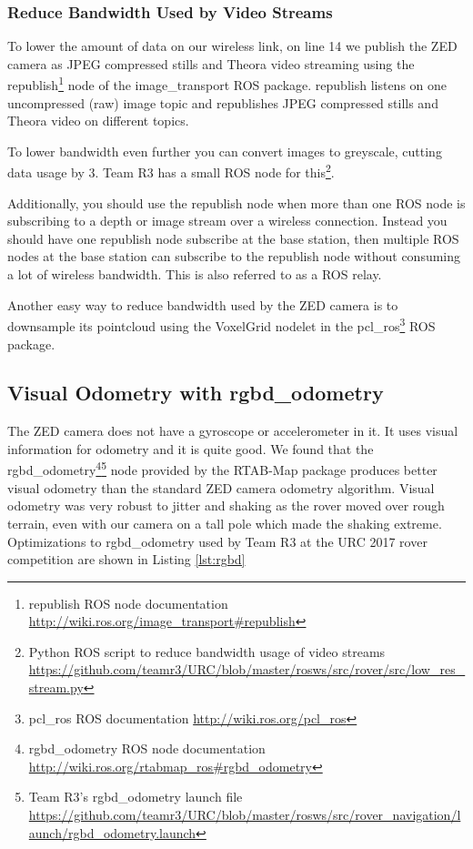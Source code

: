 \documentclass[runningheads,a4paper]{llncs}
\begin{document}
\subsubsection*{Reduce Bandwidth Used by Video Streams} To lower the amount of data on our wireless link, on line 14 we publish the ZED camera as JPEG compressed stills and Theora video streaming using the republish\footnote{republish ROS node documentation \url{http://wiki.ros.org/image_transport#republish}} node of the image\_transport ROS package. republish listens on one uncompressed (raw) image topic and republishes JPEG compressed stills and Theora video on different topics.

To lower bandwidth even further you can convert images to greyscale, cutting data usage by 3. Team R3 has a small ROS node for this\footnote{Python ROS script to reduce bandwidth usage of video streams \url{https://github.com/teamr3/URC/blob/master/rosws/src/rover/src/low_res_stream.py}}.

Additionally, you should use the republish node when more than one ROS node is subscribing to a depth or image stream over a wireless connection. Instead you should have one republish node subscribe at the base station, then multiple ROS nodes at the base station can subscribe to the republish node without consuming a lot of wireless bandwidth. This is also referred to as a ROS relay.

Another easy way to reduce bandwidth used by the ZED camera is to downsample its pointcloud using the VoxelGrid nodelet in the pcl\_ros\footnote{pcl\_ros ROS documentation \url{http://wiki.ros.org/pcl_ros}} ROS package.


\subsection{Visual Odometry with rgbd\_odometry}
The ZED camera does not have a gyroscope or accelerometer in it. It uses visual information for odometry and it is quite good. We found that the rgbd\_odometry\footnote{rgbd\_odometry ROS node documentation \url{http://wiki.ros.org/rtabmap_ros#rgbd_odometry}}\footnote{Team R3's rgbd\_odometry launch file \url{https://github.com/teamr3/URC/blob/master/rosws/src/rover_navigation/launch/rgbd_odometry.launch}} node provided by the RTAB-Map package produces better visual odometry than the standard ZED camera odometry algorithm. Visual odometry was very robust to jitter and shaking as the rover moved over rough terrain, even with our camera on a tall pole which made the shaking extreme. Optimizations to rgbd\_odometry used by Team R3 at the URC 2017 rover competition are shown in Listing \ref{lst:rgbd}
\end{document}
